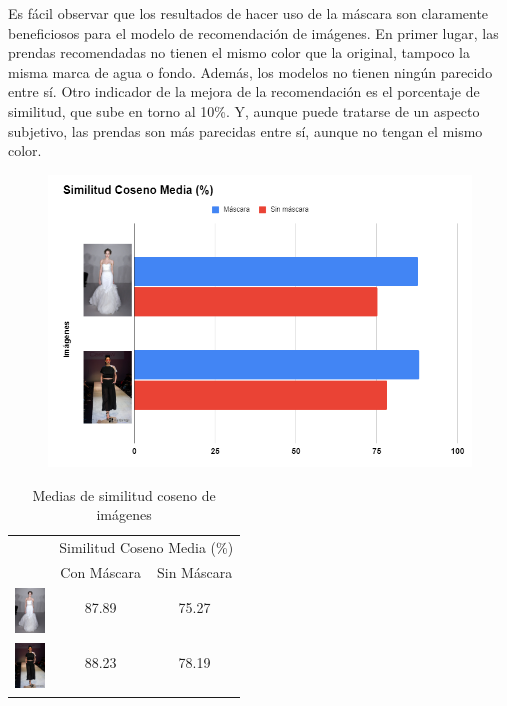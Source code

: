 \documentclass[12pt]{report} %
\begin{document}
	Es fácil observar que los resultados de hacer uso de la máscara son claramente beneficiosos para el modelo de recomendación de imágenes.
	En primer lugar, las prendas recomendadas no tienen el mismo color que la original, tampoco la misma marca de agua o fondo. Además, los modelos
	no tienen ningún parecido entre sí. Otro indicador de la mejora de la recomendación es el porcentaje de similitud, que sube en torno al 10\%.
	Y, aunque puede tratarse de un aspecto subjetivo, las prendas son más parecidas entre sí, aunque no tengan el mismo color.

	\begin{figure}[H]
		{\includegraphics[scale=0.9]{grafica-similitud.png}}
	\end{figure}

	\begin{table}[H]
    \centering
    \caption{Medias de similitud coseno de imágenes}
    \begin{tabular}{lcc}
        & \multicolumn{2}{c}{Similitud Coseno Media (\%)} \\
        \cmidrule{2-3}
        & Con Máscara & Sin Máscara \\
        \midrule
        \multirow{2}{*}{\includegraphics[width=0.8cm]{miniatura2.jpg}} & 87.89 & 75.27 \\
        &  &  \\
        \midrule
        \multirow{2}{*}{\includegraphics[width=0.8cm]{miniatura1.jpg}} & 88.23 & 78.19 \\
        &  &  \\
        \bottomrule
    \end{tabular}
	\end{table}
\end{document}
